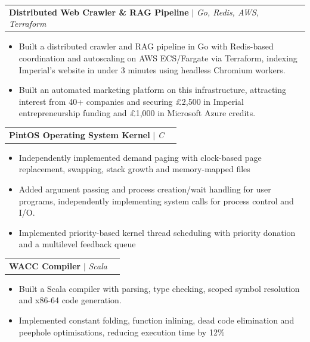 \documentclass[letterpaper,11pt]{article}
\makeatletter
\newcommand{\resumeItem}[1]{
  \item\small{
    {#1\vspace{-2pt}}
  }
}
\newcommand{\resumeProjectHeading}[2]{
    \item
    \begin{tabular*}{0.97\textwidth}{l@{\extracolsep{\fill}}r}
      \small#1 & #2 \\
    \end{tabular*}\vspace{-7pt}
}
\newcommand{\resumeItemListStart}{\begin{itemize}}
\newcommand{\resumeProjectItemListStart}{\begin{itemize}\addtolength{\itemsep}{1pt}}
\newcommand{\resumeItemListEnd}{\end{itemize}\vspace{-5pt}}
\makeatother
\begin{document}

    \resumeProjectHeading
    {\textbf{Distributed Web Crawler \& RAG Pipeline} $|$ \emph{Go, Redis, AWS, Terraform}}{}
    \resumeProjectItemListStart
      \resumeItem{Built a distributed crawler and RAG pipeline in Go with Redis-based coordination and autoscaling on AWS ECS/Fargate via Terraform, indexing Imperial’s website in under 3 minutes using headless Chromium workers.}
      \resumeItem{Built an automated marketing platform on this infrastructure, attracting interest from 40+ companies and securing £2,500 in Imperial entrepreneurship funding and £1,000 in Microsoft Azure credits.}
    \resumeItemListEnd

    \resumeProjectHeading
    {\textbf{PintOS Operating System Kernel} $|$ \emph{C}}{}
    \resumeProjectItemListStart
      \resumeItem{Independently implemented demand paging with clock-based page replacement, swapping, stack growth and memory-mapped files}
      \resumeItem{Added argument passing and process creation/wait handling for user programs, independently implementing system calls for process control and I/O.}
      \resumeItem{Implemented priority-based kernel thread scheduling with priority donation and a multilevel feedback queue}
    \resumeItemListEnd

    \resumeProjectHeading
    {\textbf{WACC Compiler} $|$ \emph{Scala}}{}
    \resumeProjectItemListStart
      \resumeItem{Built a Scala compiler with parsing, type checking, scoped symbol resolution and x86-64 code generation.}
      \resumeItem{Implemented constant folding, function inlining, dead code elimination and peephole optimisations, reducing execution time by 12\%}
    \resumeItemListEnd
\end{document}
